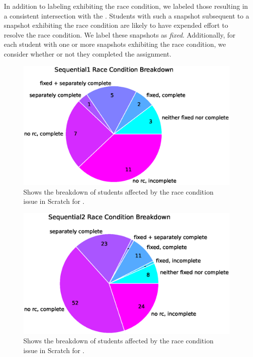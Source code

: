In addition to labeling  exhibiting the race condition, we labeled those
resulting in a consistent intersection with the \zebra{}. Students with such a
snapshot subsequent to a snapshot exhibiting the race condition are likely to
have expended effort to resolve the race condition. We label these snapshots as
\emph{fixed}. Additionally, for each student with one or more snapshots
exhibiting the race condition, we consider whether or not they completed the
assignment.

\begin{figure}[!t]
\centering \includegraphics[trim=0 .48in 0 0, clip, width=5.45in]{graphs/race_condition_Sequential1.eps}
\caption{Shows the breakdown of students affected by the race condition issue
  in Scratch for \sone{}.}
\end{figure}

\begin{figure}[!t]
\centering \includegraphics[trim=0 .5in 0 0, clip, width=5.30in]{graphs/race_condition_Sequential2.eps}
\caption{Shows the breakdown of students affected by the race condition issue
  in Scratch for \stwo{}.}
\end{figure}

